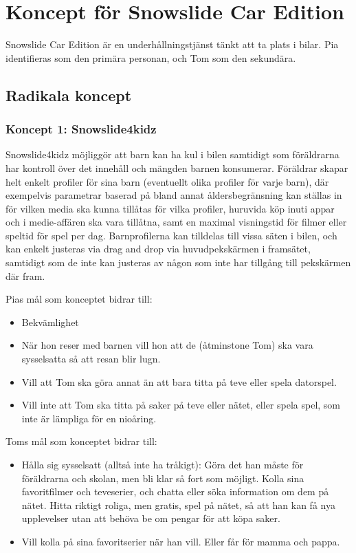 \documentclass[a4paper,12pt,titlepage]{article}
\begin{document}
\section*{Koncept för Snowslide Car Edition}

Snowslide Car Edition är en underhållningstjänst tänkt att ta plats i bilar.
Pia identifieras som den primära personan, och Tom som den sekundära.

\subsection*{Radikala koncept}

\subsubsection*{Koncept 1: Snowslide4kidz}
Snowslide4kidz möjliggör att barn kan ha kul i bilen samtidigt som föräldrarna
har kontroll över det innehåll och mängden barnen konsumerar.
Föräldrar skapar helt enkelt profiler för sina barn (eventuellt olika profiler för varje
barn), där exempelvis parametrar baserad på bland annat åldersbegränsning kan ställas in
för vilken media ska kunna tillåtas för vilka profiler, huruvida köp inuti
appar och i medie-affären ska vara tillåtna, samt en maximal visningstid för
filmer eller speltid för spel per dag. Barnprofilerna kan tilldelas till vissa
säten i bilen, och kan enkelt justeras via drag and drop via huvudpekskärmen i
framsätet, samtidigt som de inte kan justeras av någon som inte har tillgång
till pekskärmen där fram.

Pias mål som konceptet bidrar till:
\begin{itemize}
    \item Bekvämlighet
    \item När hon reser med barnen vill
        hon att de (åtminstone Tom) ska vara
        sysselsatta så att resan blir lugn.
    \item Vill att Tom ska göra annat än att
        bara titta på teve eller spela datorspel.
    \item Vill inte att Tom ska titta på saker
        på teve eller nätet, eller spela spel,
        som inte är lämpliga för en nioåring.
\end{itemize}

Toms mål som konceptet bidrar till:
\begin{itemize}
    \item Hålla sig sysselsatt (alltså inte ha
        tråkigt): Göra det han måste för
        föräldrarna och skolan, men bli klar så
        fort som möjligt. Kolla sina
        favoritfilmer och teveserier, och chatta
        eller söka information om dem på
        nätet. Hitta riktigt roliga, men gratis,
        spel på nätet, så att han kan få nya
        upplevelser utan att behöva be om
        pengar för att köpa saker. 
    \item Vill kolla på sina favoritserier när
        han vill. Eller får för mamma och
        pappa.
\end{itemize}
\end{document}
